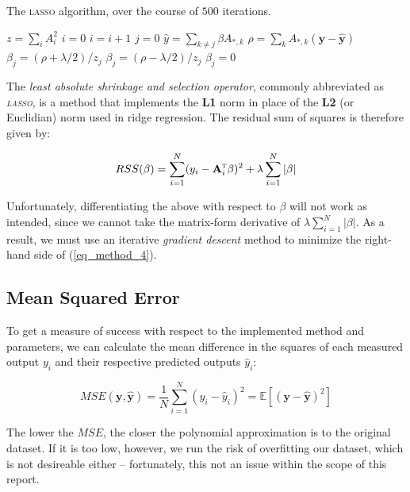 \documentclass[a4paper,10pt,english]{article}
\begin{document}
\begin{algorithm}[H]
	\caption{The \textsc{lasso} algorithm, over the course of $500$ iterations.}
	\begin{algorithmic}[1]
		\State $z = \sum_i A_i^2$
		\State $i = 0$
		\State $i = i + 1$
		\State $j = 0$
		\State $\hat{y} = \sum_{k \neq j} \beta A_{*,k}$
		\State $\rho = \sum_k A_{*,k} (\mathbf{y} - \mathbf{\hat{y}})$
		\State $\beta_j = (\rho + \lambda/2)/z_j$
		\State $\beta_j = (\rho - \lambda/2)/z_j$
		\Else
		\State $\beta_j = 0$
		\EndIf
		\EndWhile		
		\EndWhile
	\end{algorithmic}
\end{algorithm}


The \textit{least absolute shrinkage and selection operator}, commonly abbreviated as \textit{\textsc{lasso}}, is a method that implements the \textbf{L1} norm in place of the \textbf{L2} (or Euclidian) norm used in ridge regression.  The residual sum of squares is therefore given by:

\begin{equation}
\label{eq_method_4}
RSS(\beta) = \sum_{i=1}^N (y_i - \mathbf{A}_i^\textsc{t} \beta)^2 + \lambda \sum_{i=1}^N |\beta|
\end{equation}

Unfortunately, differentiating the above with respect to $\beta$ will not work as intended, since we cannot take the matrix-form derivative of $\lambda \sum_{i=1}^N |\beta|$.  As a result, we must use an iterative \textit{gradient descent} method to minimize the right-hand side of (\ref{eq_method_4}).

\subsection*{Mean Squared Error}

To get a measure of success with respect to the implemented method and parameters, we can calculate the mean difference in the squares of each measured output $y_i$ and their respective predicted outputs $\hat{y}_i$:

\begin{equation}
MSE(\mathbf{y}, \mathbf{\hat{y}}) = \frac{1}{N} \sum_{i=1}^{N} (y_i - \hat{y}_i)^2 = \mathbb{E}\left[(\mathbf{y}-\hat{\mathbf{y}})^{2}\right]
\end{equation}

The lower the $MSE$, the closer the polynomial approximation is to the original dataset.  If it is too low, however, we run the risk of overfitting our dataset, which is not desireable either – fortunately, this not an issue within the scope of this report.
\end{document}
